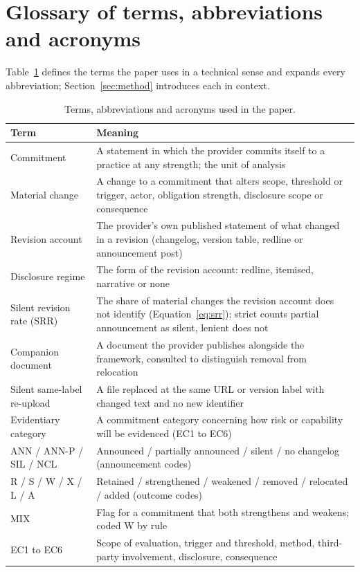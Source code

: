 \documentclass{article}
\newcommand{\srr}{\mathrm{SRR}}
\begin{document}
\section{Glossary of terms, abbreviations and acronyms}
\label{apx:glossary}
Table~\ref{tab:glossary} defines the terms the paper uses in a technical sense and expands every abbreviation; Section~\ref{sec:method} introduces each in context.
\begin{table}[tbp]\centering\small
\caption{Terms, abbreviations and acronyms used in the paper.}
\label{tab:glossary}
\begin{tabular}{lp{9.4cm}}
\toprule Term & Meaning \\ \midrule
Commitment & A statement in which the provider commits itself to a practice at any strength; the unit of analysis \\
Material change & A change to a commitment that alters scope, threshold or trigger, actor, obligation strength, disclosure scope or consequence \\
Revision account & The provider's own published statement of what changed in a revision (changelog, version table, redline or announcement post) \\
Disclosure regime & The form of the revision account: redline, itemised, narrative or none \\
Silent revision rate ($\srr$) & The share of material changes the revision account does not identify (Equation~\ref{eq:srr}); strict counts partial announcement as silent, lenient does not \\
Companion document & A document the provider publishes alongside the framework, consulted to distinguish removal from relocation \\
Silent same-label re-upload & A file replaced at the same URL or version label with changed text and no new identifier \\
Evidentiary category & A commitment category concerning how risk or capability will be evidenced (EC1 to EC6) \\
ANN / ANN-P / SIL / NCL & Announced / partially announced / silent / no changelog (announcement codes) \\
R / S / W / X / L / A & Retained / strengthened / weakened / removed / relocated / added (outcome codes) \\
MIX & Flag for a commitment that both strengthens and weakens; coded W by rule \\
EC1 to EC6 & Scope of evaluation, trigger and threshold, method, third-party involvement, disclosure, consequence \\

\end{tabular}
\end{table}
\end{document}
